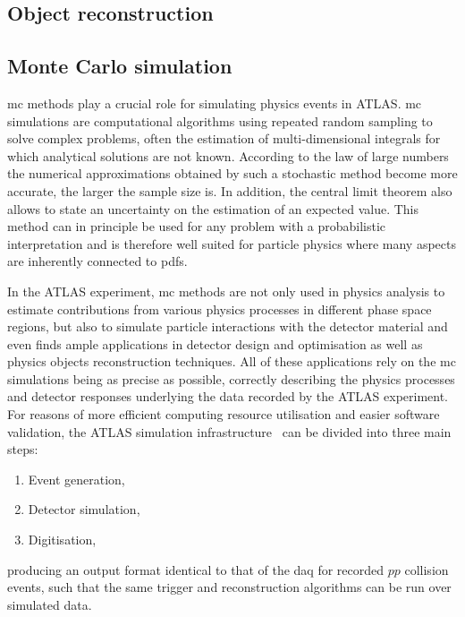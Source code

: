\subsection{Object reconstruction}

\subsection{Monte Carlo simulation}

\gls{mc} methods play a crucial role for simulating physics events in ATLAS. \gls{mc} simulations are computational algorithms using repeated random sampling to solve complex problems, often the estimation of multi-dimensional integrals for which analytical solutions are not known. According to the law of large numbers the numerical approximations obtained by such a stochastic method become more accurate, the larger the sample size is. In addition, the central limit theorem also allows to state an uncertainty on the estimation of an expected value.  This method can in principle be used for any problem with a probabilistic interpretation and is therefore well suited for particle physics where many aspects are inherently connected to \glspl{pdf}. 

In the ATLAS experiment, \gls{mc} methods are not only used in physics analysis to estimate contributions from various physics processes in different phase space regions, but also to simulate particle interactions with the detector material and even finds ample applications in detector design and optimisation as well as physics objects reconstruction techniques. All of these applications rely on the \gls{mc} simulations being as precise as possible, \ie correctly describing the physics processes and detector responses underlying the data recorded by the ATLAS experiment. For reasons of more efficient computing resource utilisation and easier software validation, the ATLAS simulation infrastructure~\cite{Aad:2010ah} can be divided into three main steps:
\begin{enumerate}[label=(\roman*)]	
	\item Event generation,
	\item Detector simulation,
	\item Digitisation,
\end{enumerate}  
producing an output format identical to that of the \gls{daq} for recorded $pp$ collision events, such that the same trigger and reconstruction algorithms can be run over simulated data.

